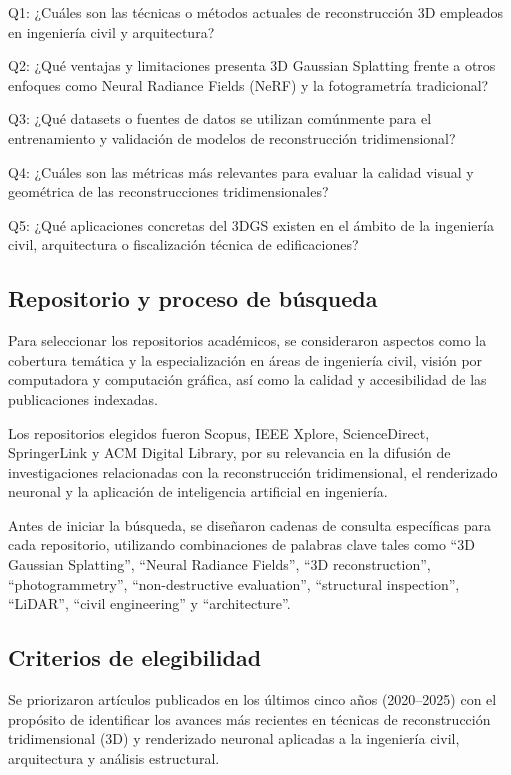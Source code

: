 \documentclass[12pt,oneside]{report}
\begin{document}
Q1: ¿Cuáles son las técnicas o métodos actuales de reconstrucción 3D empleados en ingeniería civil y arquitectura?\par

Q2: ¿Qué ventajas y limitaciones presenta 3D Gaussian Splatting frente a otros enfoques como Neural Radiance Fields (NeRF) y la fotogrametría tradicional?\par

Q3: ¿Qué datasets o fuentes de datos se utilizan comúnmente para el entrenamiento y validación de modelos de reconstrucción tridimensional?\par

Q4: ¿Cuáles son las métricas más relevantes para evaluar la calidad visual y geométrica de las reconstrucciones tridimensionales?\par

Q5: ¿Qué aplicaciones concretas del 3DGS existen en el ámbito de la ingeniería civil, arquitectura o fiscalización técnica de edificaciones?\par

\subsection{Repositorio y proceso de búsqueda}
Para seleccionar los repositorios académicos, se consideraron aspectos como la cobertura temática y la especialización en áreas de ingeniería civil, visión por computadora y computación gráfica, así como la calidad y accesibilidad de las publicaciones indexadas.\par

Los repositorios elegidos fueron Scopus, IEEE Xplore, ScienceDirect, SpringerLink y ACM Digital Library, por su relevancia en la difusión de investigaciones relacionadas con la reconstrucción tridimensional, el renderizado neuronal y la aplicación de inteligencia artificial en ingeniería.\par

Antes de iniciar la búsqueda, se diseñaron cadenas de consulta específicas para cada repositorio, utilizando combinaciones de palabras clave tales como \enquote{3D Gaussian Splatting}, \enquote{Neural Radiance Fields}, \enquote{3D reconstruction}, \enquote{photogrammetry}, \enquote{non-destructive evaluation}, \enquote{structural inspection}, \enquote{LiDAR}, \enquote{civil engineering} y \enquote{architecture}.\par

\subsection{Criterios de elegibilidad}
Se priorizaron artículos publicados en los últimos cinco años (2020--2025) con el propósito de identificar los avances más recientes en técnicas de reconstrucción tridimensional (3D) y renderizado neuronal aplicadas a la ingeniería civil, arquitectura y análisis estructural.\par
\end{document}
